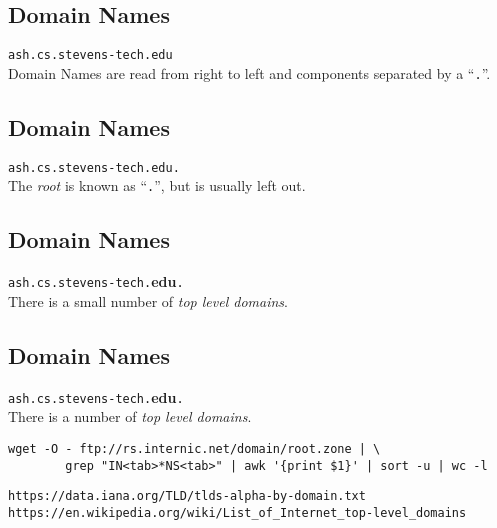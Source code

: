 \documentclass[xga]{xdvislides}
\begin{document}
\subsection{Domain Names}
\vspace{.5in}
\begin{center}
	\Huge
	\verb+ash.cs.stevens-tech.edu+ \\
	\vspace{.5in}
	Domain Names are read from right to left and components separated by a ``\verb+.+''.
\end{center}
\Normalsize

\subsection{Domain Names}
\vspace{.5in}
\begin{center}
	\Huge
	\verb+ash.cs.stevens-tech.edu.+ \\
	\vspace{.5in}
	The {\em root} is known as ``\verb+.+'', but is usually left out.
\end{center}
\Normalsize

\subsection{Domain Names}
\vspace{.5in}
\begin{center}
	\Huge
	\verb+ash.cs.stevens-tech.+{\bf edu}\verb+.+ \\
	\vspace{.5in}
	There is a small number of {\em top level domains}.
\end{center}
\Normalsize

\subsection{Domain Names}
\vspace{.5in}
\begin{center}
	\Huge
	\verb+ash.cs.stevens-tech.+{\bf edu}\verb+.+ \\
	\vspace{.5in}
	There is a number of {\em top level domains}. \\
	\vspace{.5in}
	\Normalsize
	\begin{verbatim}
wget -O - ftp://rs.internic.net/domain/root.zone | \
        grep "IN<tab>*NS<tab>" | awk '{print $1}' | sort -u | wc -l
\end{verbatim}
	\vspace{.25in}
	\verb+https://data.iana.org/TLD/tlds-alpha-by-domain.txt+ \\
	\verb+https://en.wikipedia.org/wiki/List_of_Internet_top-level_domains+
\end{center}
\Normalsize
\end{document}
